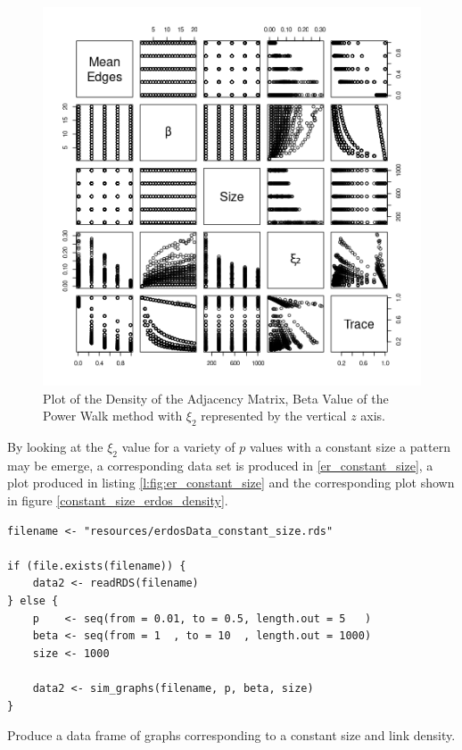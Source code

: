 \documentclass[11pt]{article}
\begin{document}
\begin{figure}[htbp]
\centering
\includegraphics[width=12cm]{media/cor_matrix-er.png}
\caption{\label{fig:plotly_dens}Plot of the Density of the Adjacency Matrix, Beta Value of the Power Walk method with \(\xi_{2}\) represented by the vertical \(z\) axis.}
\end{figure}


By looking at the \(\xi_{2}\) value for a variety of \(p\) values with a
constant size a pattern may be emerge, a corresponding data set is produced in
\ref{er_constant_size}, a plot produced in listing \ref{l:fig:er_constant_size} and the
corresponding plot shown in figure \ref{constant_size_erdos_density}.

\begin{listing}[htbp]
\begin{verbatim}
filename <- "resources/erdosData_constant_size.rds"

if (file.exists(filename)) {
    data2 <- readRDS(filename)
} else {
    p    <- seq(from = 0.01, to = 0.5, length.out = 5   )
    beta <- seq(from = 1  , to = 10  , length.out = 1000)
    size <- 1000

    data2 <- sim_graphs(filename, p, beta, size)
}
\end{verbatim}
\caption{\label{er_constant_size}Produce a data frame of graphs corresponding to a constant size and link density.}
\end{listing}
\end{document}
